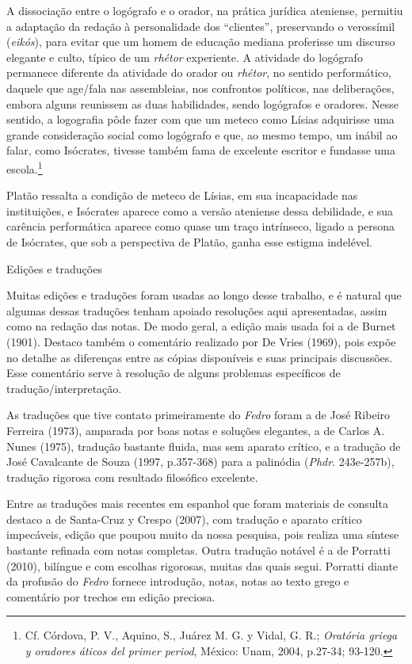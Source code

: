 A dissociação entre o logógrafo e o orador, na prática jurídica
ateniense, permitiu a adaptação da redação à personalidade dos
``clientes'', preservando o verossímil (\emph{eikós}), para evitar que
um homem de educação mediana proferisse um discurso elegante e culto,
típico de um \emph{rhétor} experiente. A atividade do logógrafo
permanece diferente da atividade do orador ou \emph{rhétor}, no sentido
performático, daquele que age/fala nas assembleias, nos confrontos
políticos, nas deliberações, embora alguns reunissem as duas
habilidades, sendo logógrafos e oradores. Nesse sentido, a logografia
pôde fazer com que um meteco como Lísias adquirisse uma grande
consideração social como logógrafo e que, ao mesmo tempo, um inábil ao
falar, como Isócrates, tivesse também fama de excelente escritor e
fundasse uma escola.\footnote{Cf. Córdova, P. V., Aquino, S., Juárez M.
  G. y Vidal, G. R.; \emph{Oratória griega y oradores áticos del primer
  period}, México: Unam, 2004, p.27-34; 93-120.}

Platão ressalta a condição de meteco de Lísias, em sua incapacidade nas
instituições, e Isócrates aparece como a versão ateniense dessa
debilidade, e sua carência performática aparece como quase um traço
intrínseco, ligado a persona de Isócrates, que sob a perspectiva de
Platão, ganha esse estigma indelével.

Edições e traduções

Muitas edições e traduções foram usadas ao longo desse trabalho, e é
natural que algumas dessas traduções tenham apoiado resoluções aqui
apresentadas, assim como na redação das notas. De modo geral, a edição
mais usada foi a de Burnet (1901). Destaco também o comentário realizado
por De Vries (1969), pois expõe no detalhe as diferenças entre as cópias
disponíveis e suas principais discussões. Esse comentário serve à
resolução de alguns problemas específicos de tradução/interpretação.

As traduções que tive contato primeiramente do \emph{Fedro} foram a de
José Ribeiro Ferreira (1973), amparada por boas notas e soluções
elegantes, a de Carlos A. Nunes (1975), tradução bastante fluida, mas
sem aparato crítico, e a tradução de José Cavalcante de Souza (1997,
p.357-368) para a palinódia (\emph{Phdr}. 243e-257b), tradução rigorosa
com resultado filosófico excelente.

Entre as traduções mais recentes em espanhol que foram materiais de
consulta destaco a de Santa-Cruz y Crespo (2007), com tradução e aparato
crítico impecáveis, edição que poupou muito da nossa pesquisa, pois
realiza uma síntese bastante refinada com notas completas. Outra
tradução notável é a de Porratti (2010), bilíngue e com escolhas
rigorosas, muitas das quais segui. Porratti diante da profusão do
\emph{Fedro} fornece introdução, notas, notas ao texto grego e
comentário por trechos em edição preciosa.

